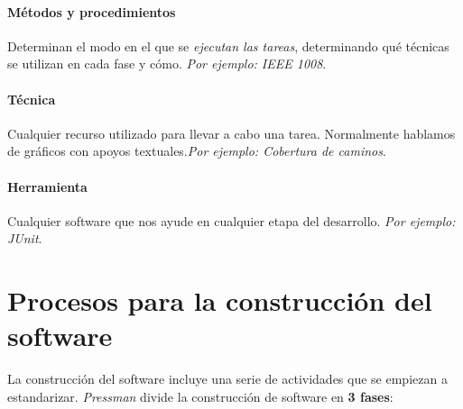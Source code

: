 \paragraph{Métodos y procedimientos} Determinan el modo en el que se \textit{ejecutan las tareas}, determinando qué técnicas se utilizan en cada fase y cómo. \textit{Por ejemplo: IEEE 1008}.

\paragraph{Técnica} Cualquier recurso utilizado para llevar a cabo una tarea. Normalmente hablamos de gráficos con apoyos textuales.\textit{Por ejemplo: Cobertura de caminos}.

\paragraph{Herramienta} Cualquier software que nos ayude en cualquier etapa del desarrollo. \textit{Por ejemplo: JUnit}.


\section{Procesos para la construcción del software}


La construcción del software incluye una serie de actividades que se empiezan a estandarizar. \textit{Pressman} divide la construcción de software en \textbf{3 fases}:

